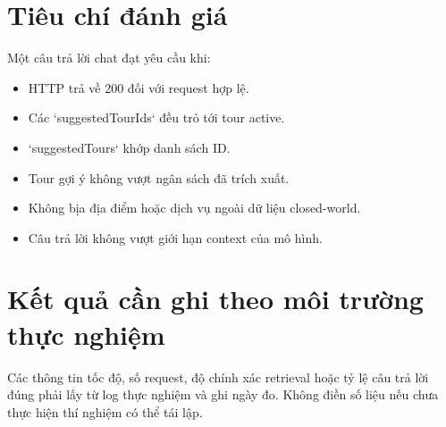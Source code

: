 \section{Tiêu chí đánh giá}
Một câu trả lời chat đạt yêu cầu khi:
\begin{itemize}
    \item HTTP trả về 200 đối với request hợp lệ.
    \item Các `suggestedTourIds` đều trỏ tới tour active.
    \item `suggestedTours` khớp danh sách ID.
    \item Tour gợi ý không vượt ngân sách đã trích xuất.
    \item Không bịa địa điểm hoặc dịch vụ ngoài dữ liệu closed-world.
    \item Câu trả lời không vượt giới hạn context của mô hình.
\end{itemize}

\section{Kết quả cần ghi theo môi trường thực nghiệm}
Các thông tin tốc độ, số request, độ chính xác retrieval hoặc tỷ lệ câu trả lời đúng phải lấy từ log thực nghiệm và ghi ngày đo. Không điền số liệu nếu chưa thực hiện thí nghiệm có thể tái lập.
